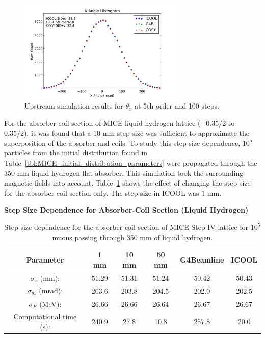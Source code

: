 \begin{figure}[H]
  \centering
    \includegraphics[width=0.7\textwidth]{MICE data/upstream/px} 
  \caption{Upstream simulation results for $\theta_x$ at 5th order and 100 steps.}
  \label{fig:uppx}
\end{figure}

For the absorber-coil section of MICE liquid hydrogen lattice ($-$0.35/2 to 0.35/2), it was found that a 10 mm step size was sufficient to approximate the superposition of the absorber and coils. To study this step size dependence, $10^5$ particles from the initial distribution found in Table~\ref{tbl:MICE_initial_distribution_parameters} were propagated through the 350 mm liquid hydrogen flat absorber. This simulation took the surrounding magnetic fields into account. Table~\ref{tbl:mice_step_size_ac} shows the effect of changing the step size for the absorber-coil section only. The step size in ICOOL was 1 mm.

\begin{table}
\caption*{\textbf{Step Size Dependence for Absorber-Coil Section (Liquid Hydrogen)}}
\begin{center}
\begin{tabularx}{\textwidth}{cccccc}
\hline \hline
Parameter &1 mm & 10 mm & 50 mm & G4Beamline & ICOOL\\
\hline
$\sigma_x$ (mm): & 51.29 & 51.31 & 51.24 & 50.42 & 50.43\\
$\sigma_{\theta_x}$ (mrad): & 203.6 & 203.8 & 204.5 & 202.0 & 202.5\\
$\sigma_E$ (MeV): & 26.66 & 26.66 & 26.64 & 26.67 & 26.67\\
Computational time (s): & 240.9 & 27.8 & 10.8 & 257.8 & 20.0\\
\hline
\end{tabularx}
\end{center}
\caption[Step size dependence for the absorber-coil section of MICE Step IV lattice for liquid hydrogen.]{Step size dependence for the absorber-coil section of MICE Step IV lattice for $10^5$ muons passing through 350 mm of liquid hydrogen.}
\label{tbl:mice_step_size_ac}
\end{table}

